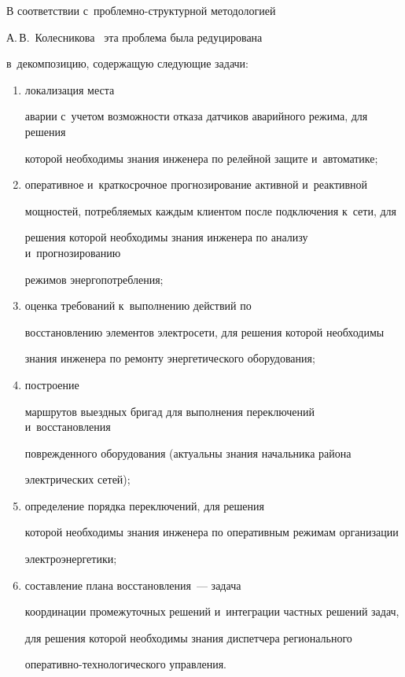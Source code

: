   


  В соответствии с~проблемно-структурной методологией 


А.\,В.~Колесникова~\cite{5-kl} эта проблема была редуцирована 


в~декомпозицию, содержащую следующие задачи:


\begin{enumerate}[(1)]


\item локализация места 


аварии с~учетом возможности отказа датчиков аварийного режима, для решения 


которой необходимы знания инженера по релейной защите и~автоматике; 


\item оперативное и~краткосрочное прогнозирование активной и~реактивной 


мощностей, потребляемых каждым клиентом после подключения к~сети, для 


решения которой необходимы знания инженера по анализу и~прогнозированию 


режимов энергопотребления; 


\item оценка требований к~выполнению действий по 


восстановлению элементов электросети, для решения которой необходимы 


знания инженера по ремонту энергетического оборудования; 


\item построение 


маршрутов выездных бригад для выполнения переключений и~восстановления 


поврежденного оборудования (актуальны знания начальника района 


электрических сетей); 


\item определение порядка переключений, для решения 


которой необходимы знания инженера по оперативным режимам организации 


электроэнергетики; 


\item составление плана восстановления~--- задача 


координации промежуточных решений и~интеграции частных решений задач, 


для решения которой необходимы знания диспетчера регионального  


опе\-ра\-тив\-но-тех\-но\-ло\-ги\-че\-ско\-го управ\-ления.


\end{enumerate}


